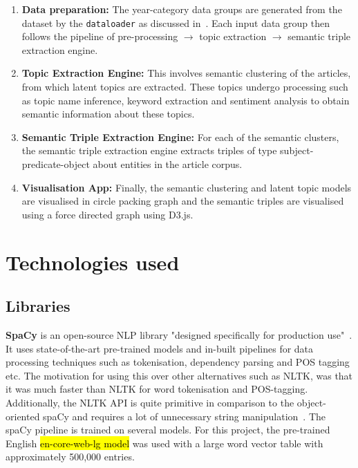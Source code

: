 \begin{enumerate}
    \item \textbf{Data preparation:} The year-category data groups are generated from the dataset by the \texttt{dataloader} as discussed in~. Each input data group then follows the pipeline of pre-processing $\rightarrow$ topic extraction $\rightarrow$ semantic triple extraction engine. 
    
    \item \textbf{Topic Extraction Engine:} This involves semantic clustering of the articles, from which latent topics are extracted. These topics undergo processing such as topic name inference, keyword extraction and sentiment analysis to obtain semantic information about these topics.
    
    \item \textbf{Semantic Triple Extraction Engine:} For each of the semantic  clusters, the semantic triple extraction engine extracts triples of type subject-predicate-object about entities in the article corpus. 
    
    \item \textbf{Visualisation App:} Finally, the semantic clustering and latent topic models are visualised in circle packing graph and the semantic triples are visualised using a force directed graph using D3.js. 
    
\end{enumerate}
\section{Technologies used}
\subsection{Libraries} \label{libraries}

\textbf{SpaCy} is an open-source NLP library "designed specifically for production use"~\cite{spacy}. It uses state-of-the-art pre-trained models and in-built pipelines for data processing techniques such as tokenisation, dependency parsing and POS tagging etc. The motivation for using this over other alternatives such as NLTK, was that it was much faster than NLTK for word tokenisation and POS-tagging. Additionally, the NLTK API is quite primitive in comparison to the object-oriented spaCy and requires a lot of unnecessary string manipulation~\cite{spacy-nltk}. The spaCy pipeline is trained on several models. For this project, the pre-trained English \hl{en-core-web-lg model} was used with a large word vector table with approximately 500,000 entries.  

